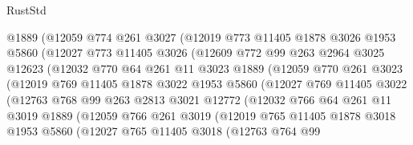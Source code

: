 \begin{lexlean}{RustStd}
\begin{coremodule}
              @1889
              (@12059
                @774
                @261
                @3027
                (@12019
                  @773
                  @11405
                  @1878
                  @3026
                  @1953
                  @5860
                  (@12027
                    @773
                    @11405
                    @3026
                    (@12609
                      @772
                      @99
                      @263
                      @2964
                      @3025
                      @12623
                      (@12032
                        @770
                        @64
                        @261
                        @11
                        @3023
                        @1889
                        (@12059
                          @770
                          @261
                          @3023
                          (@12019
                            @769
                            @11405
                            @1878
                            @3022
                            @1953
                            @5860
                            (@12027
                              @769
                              @11405
                              @3022
                              (@12763
                                @768
                                @99
                                @263
                                @2813
                                @3021
                                @12772
                                (@12032
                                  @766
                                  @64
                                  @261
                                  @11
                                  @3019
                                  @1889
                                  (@12059
                                    @766
                                    @261
                                    @3019
                                    (@12019
                                      @765
                                      @11405
                                      @1878
                                      @3018
                                      @1953
                                      @5860
                                      (@12027
                                        @765
                                        @11405
                                        @3018
                                        (@12763
                                          @764
                                          @99

\end{coremodule}
\end{lexlean}
